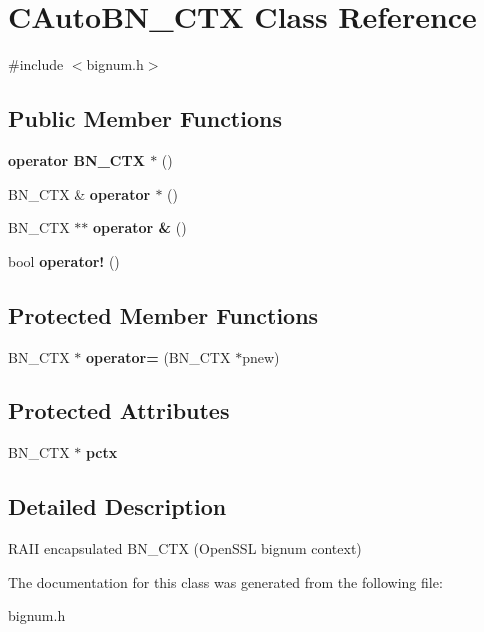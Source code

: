 \hypertarget{class_c_auto_b_n___c_t_x}{}\section{C\+Auto\+B\+N\+\_\+\+C\+TX Class Reference}
\label{class_c_auto_b_n___c_t_x}


{\ttfamily \#include $<$bignum.\+h$>$}

\subsection*{Public Member Functions}
\begin{DoxyCompactItemize}
\item 
\mbox{\label{class_c_auto_b_n___c_t_x_a17f28434d1ddfb3133ba34aaa73d44b4}} 
{\bfseries operator B\+N\+\_\+\+C\+T\+X $\ast$} ()
\item 
\mbox{\label{class_c_auto_b_n___c_t_x_a488b3e2475084e0d5c951b09bf0b4cdd}} 
B\+N\+\_\+\+C\+TX \& {\bfseries operator $\ast$} ()
\item 
\mbox{\label{class_c_auto_b_n___c_t_x_a534100cc31c84acc11fe9625bcc13d4a}} 
B\+N\+\_\+\+C\+TX $\ast$$\ast$ {\bfseries operator \&} ()
\item 
\mbox{\label{class_c_auto_b_n___c_t_x_a33c967d143efcbfafcac9f863fce1d4f}} 
bool {\bfseries operator!} ()
\end{DoxyCompactItemize}
\subsection*{Protected Member Functions}
\begin{DoxyCompactItemize}
\item 
\mbox{\label{class_c_auto_b_n___c_t_x_a954a9a333d2041861500e5cb471fa8f6}} 
B\+N\+\_\+\+C\+TX $\ast$ {\bfseries operator=} (B\+N\+\_\+\+C\+TX $\ast$pnew)
\end{DoxyCompactItemize}
\subsection*{Protected Attributes}
\begin{DoxyCompactItemize}
\item 
\mbox{\label{class_c_auto_b_n___c_t_x_a264ef42b71cb55111928fce1aa4d9ad3}} 
B\+N\+\_\+\+C\+TX $\ast$ {\bfseries pctx}
\end{DoxyCompactItemize}


\subsection{Detailed Description}
R\+A\+II encapsulated B\+N\+\_\+\+C\+TX (Open\+S\+SL bignum context) 

The documentation for this class was generated from the following file\+:\begin{DoxyCompactItemize}
\item 
bignum.\+h\end{DoxyCompactItemize}

